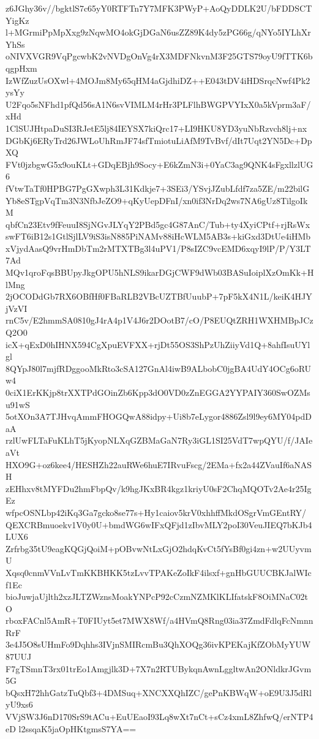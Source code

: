 z6JGhy36v//bgktlS7c65yY0RTFTn7Y7MFK3PWyP+AoQyDDLK2U/bFDDSCTYigKz
l+MGrmiPpMpXxg9zNqwMO4okGjDGaN6usZZ89K4dy5zPG66g/qNYo5IYLhXrYhSs
oNIVXVGR9VqPgcwbK2vNVDgOnVg4rX3MDFNkvnM3F25GTS79oyU9fTTK6bqgpHxm
IzWfZuzUsOXwl+4MOJm8My65qHM4aGjdhiDZ++E043tDV4iHDSrqcNwf4Pk2ysYy
U2Fqo5sNFhd1pfQd56sA1N6svVIMLM4rHr3PLFlhBWGPVYIxX0a5kVprm3aF/xHd
1ClSUJHtpaDuSI3RJetE5lj84IEYSX7kiQrc17+LI9HKU8YD3yuNbRzvch8lj+nx
DGbKj6ERyTrd26JWLoUhRmJF74sfTmiotuLiAfM9TvBvf/dIt7Uqt2YN5Dc+DpXQ
FVt0jzbgwG5x9ouKLt+GDqEBjh9Socy+E6kZmN3i+0YaC3ag9QNK4sFgxllzlUG6
fVtwTaTf0HPBG7PgGXwph3L31Kdkje7+3SEi3/YSvjJZubLfdf7za5ZE/m22bilG
Yb8eSTgpVqTm3N3NfbJeZO9+qKyUepDFnI/xn0if3NrDq2ws7NA6gUz8TilgoIkM
qbfCn23Etv9fFeuuI8SjNGvJLYqY2PBd5gc4G87AnC/Tub+ty4XyiCPtf+rjRsWx
swFT6iB12s1GtlSjlLV9iS3isN885PiNAMv88iHcWLM5AB3s+kiGxd3DtUe4iHMb
xVjydAasQ9vrHmDbTm2rMTXTBg3l4uPV1/P8sIZC9vcEMD6xqyI9lP/P/Y3LT7Ad
MQv1qroFqsBBUpyJkgOPU5hNLS9ikarDGjCWF9dWb03BASuIoiplXzOmKk+HlMng
2jOCODdGb7RX6OBfHf0FBaRLB2VBcUZTBfUuubP+7pF5kX4N1L/keiK4HJYjVzVI
rnC5v/E2hmmSA0810gJ4rA4p1V4J6r2DOotB7/cO/P8EUQtZRH1WXHMBpJCzQ2O0
icX+qExD0hIHNX594CgXpuEVFXX+rjDt55OS3ShPzUhZiiyVd1Q+8ahfIsuUYlgl
8QYpJ80l7mjfRDggooMkRto3cSA127GnAl4iwB9ALbobC0jgBA4UdY4OCg6oRUw4
0ciX1ErKKjp8trXXTPdGOinZb6Kpp3dO0VD0zZnEGGA2YYPAIY360SwOZMsu91wS
5otXOn3A7TJHvqAmmFHOGQwA88idpy+Ui8b7eLygor4886Zsl9l9ey6MY04pdDaA
rzlUwFLTaFuKLhT5jKyopNLXqGZBMaGaN7Ry3iGL1SI25VdT7wpQYU/f/JAIeaVt
HXO9G+oz6kee4/HESHZh22auRWe6huE7IRvuFscg/2EMa+fx2a44ZVauIf6aNASH
zEHhxv8tMYFDu2hmFbpQv/k9hgJKxBR4kgz1kriyU0sF2ChqMQOTv2Ae4r25IgEz
wfpcOSNLbp42iKq3Ga7gcko8se77s+Hy1caiov5krV0xhhffMkdOSgrVmGEntRY/
QEXCRBmuoekv1V0y0U+bmdWG6wIFxQFjd1zIbvMLY2poI30VeuJIEQ7bKJb4LUX6
Zrfrbg35tU9eagKQGjQoiM+pOBvwNtLxGjO2hdqKvCt5fYsBf0gi4zn+w2UUyvmU
Xqsq0cnmVVnLvTmKKBHKK5tzLvvTPAKeZoIkF4ilsxf+gnHbGUUCBKJalWIcf1Ec
bioJuwjaUjlth2xzJLTZWznsMoakYNPcP92cCzmNZMKlKLIfatskF8OiMNaC02tO
rboxFACnl5AmR+T0FIUyt5et7MWX8Wf/a4HVmQ8Rng03ia37ZmdFdlqFcNmnnRrF
3e4J5O8sUHmFo9Dqhhs3IVjnSMIRcmBu3QhXOQg36ivKPEKajKfZObMyYUW87UUJ
F7gTSmnT3rx01trEo1Amgjlk3D+7X7n2RTUBykqnAwnLggltwAn2ONldkrJGvm5G
bQsxH72hhGatzTuQbf3+4DMSuq+XNCXXQhIZC/gePnKBWqW+oE9U3J5dRlyU9xs6
VVjSW3J6nD170SrS9tACu+EuUEaoI93Lq8wXt7nCt+sCz4xmL8ZhfwQ/erNTP4eD
l2ssqaK5jaOpHKtgmsS7YA==
